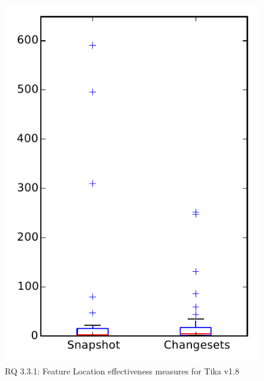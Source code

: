 
\begin{figure}
\centering
\includegraphics[height=0.4\textheight]{figures/flt/rq1_tika}
\caption{RQ 3.3.1: Feature Location effectiveness measures for Tika v1.8}
\label{fig:flt:rq1:tika}
\end{figure}
